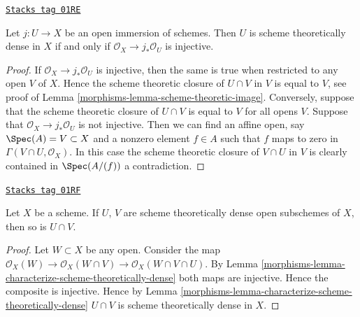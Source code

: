 \begin{lemma}
\label{morphisms-lemma-characterize-scheme-theoretically-dense}
\href{https://stacks.math.columbia.edu/tag/01RE}{\texttt{Stacks tag 01RE}}

Let $j : U \to X$ be an open immersion of schemes.
Then $U$ is scheme theoretically dense in $X$ if and only if
$\mathcal{O}_X \to j_*\mathcal{O}_U$ is injective.
\end{lemma}

\begin{proof}

If $\mathcal{O}_X \to j_*\mathcal{O}_U$ is injective,
then the same is true when restricted to any open $V$ of $X$.
Hence the scheme theoretic closure of $U \cap V$ in $V$
is equal to $V$, see proof of Lemma \ref{morphisms-lemma-scheme-theoretic-image}.
Conversely, suppose that the scheme theoretic
closure of $U \cap V$ is equal to $V$ for all opens $V$.
Suppose that $\mathcal{O}_X \to j_*\mathcal{O}_U$ is not injective.
Then we can find an affine open, say $\Spec(A) = V \subset X$
and a nonzero element $f \in A$ such that $f$ maps to zero in
$\Gamma(V \cap U, \mathcal{O}_X)$. In this case the scheme theoretic
closure of $V \cap U$ in $V$ is clearly contained in $\Spec(A/(f))$
a contradiction.
\end{proof}

\begin{lemma}
\label{morphisms-lemma-intersection-scheme-theoretically-dense}
\href{https://stacks.math.columbia.edu/tag/01RF}{\texttt{Stacks tag 01RF}}

Let $X$ be a scheme. If $U$, $V$ are scheme theoretically dense
open subschemes of $X$, then so is $U \cap V$.
\end{lemma}

\begin{proof}

Let $W \subset X$ be any open.
Consider the map
$\mathcal{O}_X(W) \to \mathcal{O}_X(W \cap V)
\to \mathcal{O}_X(W \cap V \cap U)$.
By Lemma \ref{morphisms-lemma-characterize-scheme-theoretically-dense}
both maps are injective. Hence the composite is injective.
Hence by Lemma \ref{morphisms-lemma-characterize-scheme-theoretically-dense}
$U \cap V$ is scheme theoretically dense in $X$.
\end{proof}

